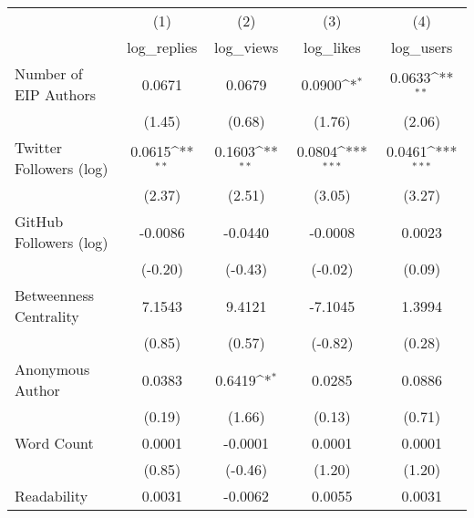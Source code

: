 {
\def\sym#1{\ifmmode^{#1}\else\(^{#1}\)\fi}
\begin{tabular}{l*{4}{c}}
\hline\hline
                                   &\multicolumn{1}{c}{(1)}&\multicolumn{1}{c}{(2)}&\multicolumn{1}{c}{(3)}&\multicolumn{1}{c}{(4)}\\
                                   &\multicolumn{1}{c}{log\_replies}&\multicolumn{1}{c}{log\_views}&\multicolumn{1}{c}{log\_likes}&\multicolumn{1}{c}{log\_users}\\
\hline
Number of EIP Authors              &      0.0671         &      0.0679         &      0.0900\sym{*}  &      0.0633\sym{**} \\
                                   &      (1.45)         &      (0.68)         &      (1.76)         &      (2.06)         \\
[1em]
Twitter Followers (log)            &      0.0615\sym{**} &      0.1603\sym{**} &      0.0804\sym{***}&      0.0461\sym{***}\\
                                   &      (2.37)         &      (2.51)         &      (3.05)         &      (3.27)         \\
[1em]
GitHub Followers (log)             &     -0.0086         &     -0.0440         &     -0.0008         &      0.0023         \\
                                   &     (-0.20)         &     (-0.43)         &     (-0.02)         &      (0.09)         \\
[1em]
Betweenness Centrality             &      7.1543         &      9.4121         &     -7.1045         &      1.3994         \\
                                   &      (0.85)         &      (0.57)         &     (-0.82)         &      (0.28)         \\
[1em]
Anonymous Author                   &      0.0383         &      0.6419\sym{*}  &      0.0285         &      0.0886         \\
                                   &      (0.19)         &      (1.66)         &      (0.13)         &      (0.71)         \\
[1em]
Word Count                         &      0.0001         &     -0.0001         &      0.0001         &      0.0001         \\
                                   &      (0.85)         &     (-0.46)         &      (1.20)         &      (1.20)         \\
[1em]
Readability                        &      0.0031         &     -0.0062         &      0.0055         &      0.0031         \\

\end{tabular}}
